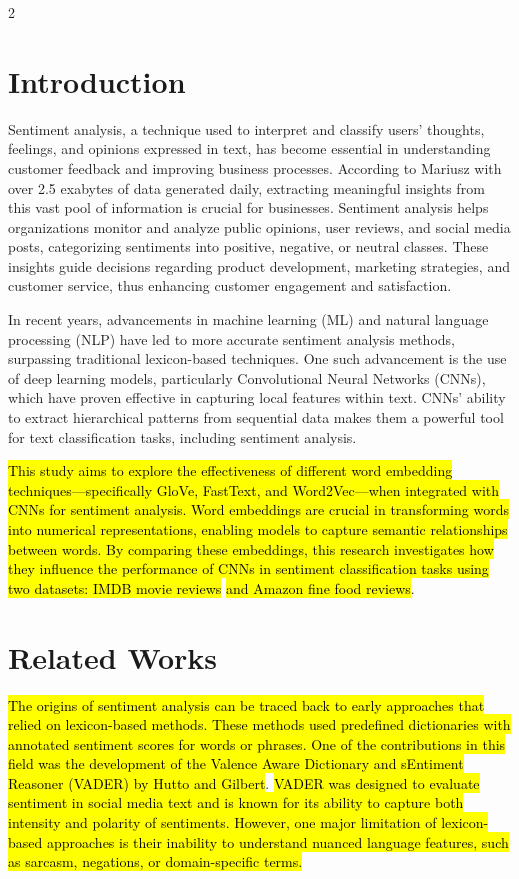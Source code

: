 \documentclass[10pt,a4paper]{article}
\begin{document}
\begin{multicols}{2}
\section*{Introduction}

Sentiment analysis, a technique used to interpret and classify users' thoughts, feelings, and opinions expressed in text, has become essential in understanding customer feedback and improving business processes. According to Mariusz\cite{Michalowski_2024} with over 2.5 exabytes of data generated daily, extracting meaningful insights from this vast pool of information is crucial for businesses. Sentiment analysis helps organizations monitor and analyze public opinions, user reviews, and social media posts, categorizing sentiments into positive, negative, or neutral classes. These insights guide decisions regarding product development, marketing strategies, and customer service, thus enhancing customer engagement and satisfaction.

In recent years, advancements in machine learning (ML) and natural language processing (NLP) have led to more accurate sentiment analysis methods, surpassing traditional lexicon-based techniques. One such advancement is the use of deep learning models, particularly Convolutional Neural Networks (CNNs), which have proven effective in capturing local features within text. CNNs' ability to extract hierarchical patterns from sequential data makes them a powerful tool for text classification tasks, including sentiment analysis.

\hl{This study aims to explore the effectiveness of different word embedding techniques—specifically GloVe, FastText, and Word2Vec—when integrated with CNNs for sentiment analysis. Word embeddings are crucial in transforming words into numerical representations, enabling models to capture semantic relationships between words. By comparing these embeddings, this research investigates how they influence the performance of CNNs in sentiment classification tasks using two datasets: IMDB movie reviews}\cite{N_2019} \hl{and Amazon fine food reviews}\cite{Project_2017}.


\section*{Related Works}

\hl{The origins of sentiment analysis can be traced back to early approaches that relied on lexicon-based methods. These methods used predefined dictionaries with annotated sentiment scores for words or phrases. One of the contributions in this field was the development of the Valence Aware Dictionary and sEntiment Reasoner (VADER) by Hutto and Gilbert}\cite{hutto2014vader}. \hl{VADER was designed to evaluate sentiment in social media text and is known for its ability to capture both intensity and polarity of sentiments. However, one major limitation of lexicon-based approaches is their inability to understand nuanced language features, such as sarcasm, negations, or domain-specific terms.}


\end{multicols}
\end{document}
